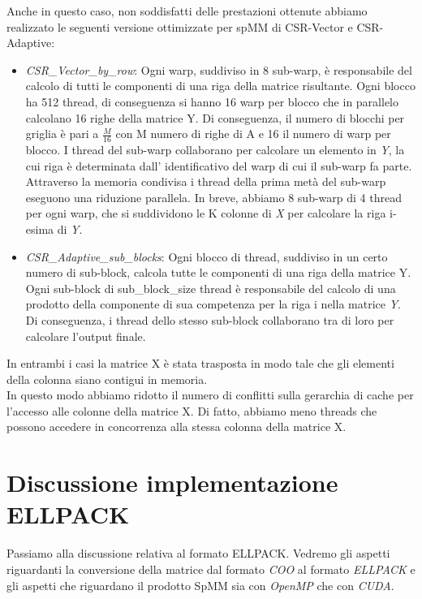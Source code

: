 \documentclass{article}
\begin{document}
Anche in questo caso, non soddisfatti delle prestazioni ottenute abbiamo realizzato le seguenti versione ottimizzate per spMM di CSR-Vector e CSR-Adaptive:
  \begin{itemize}
   \item \textit{CSR\_Vector\_by\_row}: 
    Ogni warp, suddiviso in 8 sub-warp, è responsabile del calcolo di tutti le componenti di una riga della matrice risultante. Ogni blocco ha 512 thread, di conseguenza si hanno 16 warp per blocco che in parallelo calcolano 16 righe della matrice Y. Di conseguenza, il numero di blocchi per griglia è pari a $\frac{M}{16}$ con M numero di righe di A e 16 il numero di warp per blocco. I thread del sub-warp collaborano per calcolare un elemento in \textit{Y}, la cui riga è determinata dall' identificativo del warp di cui il sub-warp fa parte. Attraverso la memoria condivisa i thread della prima metà del sub-warp eseguono una riduzione parallela. In breve, abbiamo 8 sub-warp di 4 thread per ogni warp, che si suddividono le K colonne di \textit{X} per calcolare la riga i-esima di \textit{Y}.
   
   \item \textit{CSR\_Adaptive\_sub\_blocks}: Ogni blocco di thread, suddiviso in un certo numero di sub-block, calcola tutte le componenti di una riga della matrice Y. Ogni sub-block di sub\_block\_size thread è responsabile del calcolo di una prodotto della componente di sua competenza per la riga i nella matrice \textit{Y}. Di conseguenza, i thread dello stesso sub-block collaborano tra di loro per calcolare l'output finale.
   \end{itemize}
   
In entrambi i casi la matrice X è stata trasposta in modo tale che gli elementi della colonna siano contigui in memoria. \\

In questo modo abbiamo ridotto il numero di conflitti sulla gerarchia di cache per l'accesso alle colonne della matrice X. Di fatto, abbiamo meno threads che possono accedere in concorrenza alla stessa colonna della matrice X.


\section{Discussione implementazione ELLPACK}
Passiamo alla discussione relativa al formato ELLPACK. Vedremo gli aspetti riguardanti la conversione della matrice dal formato \textit{COO} al formato \textit{ELLPACK} e gli aspetti che riguardano il prodotto SpMM sia con \textit{OpenMP} che con \textit{CUDA}.
\end{document}
